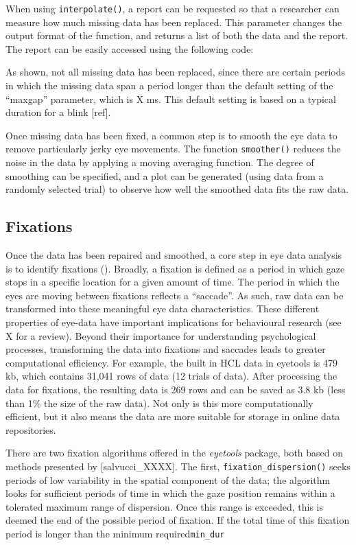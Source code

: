 \documentclass[
  man,
  floatsintext,
  longtable,
  nolmodern,
  notxfonts,
  notimes,
  colorlinks=true,linkcolor=blue,citecolor=blue,urlcolor=blue]{apa7}
\begin{document}
When using \texttt{interpolate()}, a report can be requested so that a
researcher can measure how much missing data has been replaced. This
parameter changes the output format of the function, and returns a list
of both the data and the report. The report can be easily accessed using
the following code:

As shown, not all missing data has been replaced, since there are
certain periods in which the missing data span a period longer than the
default setting of the ``maxgap'' parameter, which is X ms. This default
setting is based on a typical duration for a blink {[}ref{]}.

Once missing data has been fixed, a common step is to smooth the eye
data to remove particularly jerky eye movements. The function
\texttt{smoother()} reduces the noise in the data by applying a moving
averaging function. The degree of smoothing can be specified, and a plot
can be generated (using data from a randomly selected trial) to observe
how well the smoothed data fits the raw data.

\subsection{Fixations}\label{fixations}

Once the data has been repaired and smoothed, a core step in eye data
analysis is to identify fixations
().
Broadly, a fixation is defined as a period in which gaze stops in a
specific location for a given amount of time. The period in which the
eyes are moving between fixations reflects a ``saccade''. As such, raw
data can be transformed into these meaningful eye data characteristics.
These different properties of eye-data have important implications for
behavioural research (see X for a review). Beyond their importance for
understanding psychological processes, transforming the data into
fixations and saccades leads to greater computational efficiency. For
example, the built in HCL data in eyetools is 479 kb, which contains
31,041 rows of data (12 trials of data). After processing the data for
fixations, the resulting data is 269 rows and can be saved as 3.8 kb
(less than 1\% the size of the raw data). Not only is this more
computationally efficient, but it also means the data are more suitable
for storage in online data repositories.

There are two fixation algorithms offered in the \emph{eyetools}
package, both based on methods presented by {[}salvucci\_XXXX{]}. The
first, \texttt{fixation\_dispersion()} seeks periods of low variability
in the spatial component of the data; the algorithm looks for sufficient
periods of time in which the gaze position remains within a tolerated
maximum range of dispersion. Once this range is exceeded, this is deemed
the end of the possible period of fixation. If the total time of this
fixation period is longer than the minimum required\texttt{min\_dur}
\end{document}
